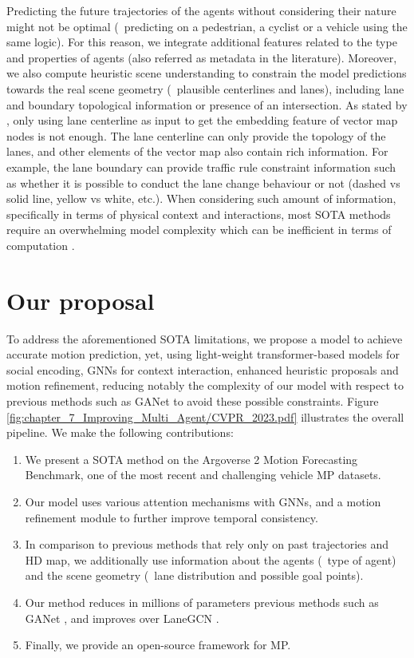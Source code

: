 Predicting the future trajectories of the agents without considering their nature might not be optimal (\eg \ predicting on a pedestrian, a cyclist or a vehicle using the same logic). For this reason, we integrate additional features related to the type and properties of agents (also referred as metadata in the literature). Moreover, we also compute heuristic scene understanding to constrain the model predictions towards the real scene geometry (\eg \ plausible centerlines and lanes), including lane and boundary topological information or presence of an intersection. 
As stated by \cite{zhang2022banet}, only using lane centerline as input to get the embedding feature of vector map nodes is not enough. The lane centerline can only provide the
topology of the lanes, and other elements of the vector map also contain rich information. For example, the lane boundary can provide traffic rule constraint information such as whether it is possible to conduct the lane change behaviour or not (dashed vs solid line, yellow vs white, etc.). When considering such amount of information, specifically in terms of physical context and interactions, most \ac{SOTA} methods require an overwhelming model complexity which can be inefficient in terms of computation \cite{gao2020vectornet, walters2020trajectory, can2022maps}.

\section{Our proposal}
\label{sec:7_our_proposal}

To address the aforementioned \ac{SOTA} limitations, we propose a model \cite{gomez2023improving} to achieve accurate motion prediction, yet, using light-weight transformer-based models for social encoding, \acp{GNN} for context interaction, enhanced heuristic proposals and motion refinement, reducing notably the complexity of our model with respect to previous methods such as GANet \cite{wang2022ganet} to avoid these possible constraints. Figure \ref{fig:chapter_7_Improving_Multi_Agent/CVPR_2023.pdf} illustrates the overall pipeline. We make the following contributions:

\begin{enumerate}
	\item We present a \ac{SOTA} method on the Argoverse 2 Motion Forecasting Benchmark, one of the most recent and challenging vehicle \ac{MP} datasets.
	\item Our model uses various attention mechanisms with GNNs, and a motion refinement module to further improve temporal consistency.
	\item In comparison to previous methods that rely only on past trajectories and HD map, we additionally use information about the agents (\eg \ type of agent) and the scene geometry (\eg \ lane distribution and possible goal points).
	\item Our method reduces in millions of parameters previous methods such as GANet \cite{wang2022ganet}, and improves over LaneGCN \cite{liang2020learning}.
	\item Finally, we provide an open-source framework for MP.
\end{enumerate}

